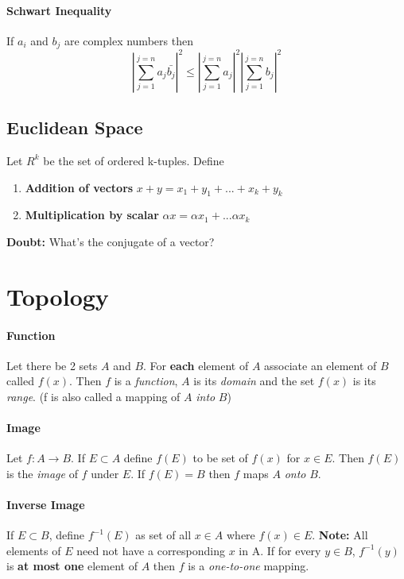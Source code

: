 \documentclass{article}
\begin{document}
	\paragraph{Schwart Inequality} If $a_i$ and $b_j$ are complex numbers then 
	\[| \sum_{j=1}^{j=n}a_j \bar{b_j}|^2 \leq |\sum_{j=1}^{j=n}a_j|^2 |\sum_{j=1}^{j=n}b_j|^2 \]

	\subsection{Euclidean Space}
	Let $R^k$ be the set of ordered k-tuples. Define
	\begin{enumerate}
		\item \textbf{Addition of vectors} $x+y = x_1+y_1 + ... + x_k+y_k$
		\item \textbf{Multiplication by scalar} $\alpha x = \alpha x_1 + ... \alpha x_k$
	\end{enumerate}
	
	\textbf{Doubt:} What's the conjugate of a vector?
	
	\section{Topology}
	\paragraph{Function} Let there be 2 sets $A$ and $B$. For \textbf{each} element of $A$ associate an element of $B$ called $f(x)$. Then $f$ is a \textit{function}, $A$ is its \textit{domain }and the set $f(x)$ is its \textit{range}. (f is also called a mapping of $A$ \textit{into} $B$)
	\paragraph{Image} Let $f:A \to B$. If $E \subset A$ define $f(E)$ to be set of $f(x)$ for $x \in E$. Then $f(E)$ is the \textit{image} of $f$ under $E$.
	If $f(E) = B$ then $f$ maps $A$ \textit{onto} $B$.
	\paragraph{Inverse Image} If $E \subset B$, define $f^{-1}(E)$ as set of all $x \in A$ where $f(x) \in E$. \textbf{Note:} All elements of $E$ need not have a corresponding $x$ in A. If for every $y \in B$, $f^{-1}(y)$ is \textbf{at most one} element of $A$ then $f$ is a \textit{one-to-one} mapping.
\end{document}

